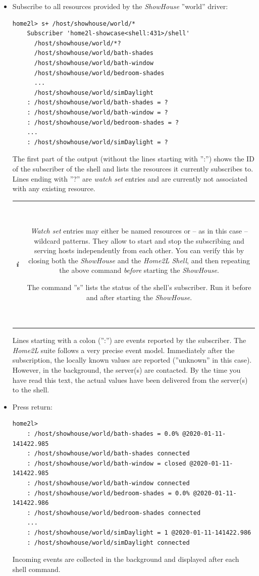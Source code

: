 \documentclass[12pt,english,parskip=half,headheight=19pt]{scrreprt}
\newcommand{\infobox}[1]{
  \par
  \medskip
  \hfill
  \setlength\arrayrulewidth{1pt}
  \begin{tabular}[t]{c|c|}
    \parbox{1.8em}{\hfill\textit{\Huge\textbf{i}\,}}
    &
    \,\parbox{0.89\linewidth}{\setlength{\parskip}{0.5em} \small #1}\,
  \end{tabular}
  \medskip
  \par
}
\begin{document}
\begin{itemize}[$\blacktriangleright$]
\item
  Subscribe to all resources provided by the \textit{ShowHouse} ''world'' driver:
  \begin{lstlisting}[language=home2l]
    home2l> s+ /host/showhouse/world/*
    Subscriber 'home2l-showcase<shell:431>/shell'
      /host/showhouse/world/*?
      /host/showhouse/world/bath-shades
      /host/showhouse/world/bath-window
      /host/showhouse/world/bedroom-shades
      ...
      /host/showhouse/world/simDaylight
    : /host/showhouse/world/bath-shades = ?
    : /host/showhouse/world/bath-window = ?
    : /host/showhouse/world/bedroom-shades = ?
    ...
    : /host/showhouse/world/simDaylight = ?
  \end{lstlisting}
  The first part of the output (without the lines starting with '':'')
  shows the ID of the subscriber of the shell and lists the resources it
  currently subscribes to. Lines ending with ''?'' are \textit{watch set}
  entries and are currently not associated with any existing resource.

  \infobox{
    \textit{Watch set} entries may either be named resources or -- as in this case -- wildcard
    patterns. They allow to start and stop the subscribing and serving hosts independently
    from each other. You can verify this by closing both the \textit{ShowHouse} and the \textit{Home2L Shell},
    and then repeating the above command \textit{before} starting the \textit{ShowHouse}.

    The command ''s'' lists the status of the shell's subscriber. Run it before and after starting
    the \textit{ShowHouse}.
  }

  Lines starting with a colon ('':'') are events reported by the
  subscriber. The \textit{Home2L} suite follows a very precise event model.
  Immediately after the subscription, the locally known values are
  reported (''unknown'' in this case). However, in the background,
  the server(s) are contacted. By the time you have read this text,
  the actual values have been delivered from the server(s) to the shell.

\item
  Press return:
  \begin{lstlisting}[language=home2l]
    home2l>
    : /host/showhouse/world/bath-shades = 0.0% @2020-01-11-141422.985
    : /host/showhouse/world/bath-shades connected
    : /host/showhouse/world/bath-window = closed @2020-01-11-141422.985
    : /host/showhouse/world/bath-window connected
    : /host/showhouse/world/bedroom-shades = 0.0% @2020-01-11-141422.986
    : /host/showhouse/world/bedroom-shades connected
    ...
    : /host/showhouse/world/simDaylight = 1 @2020-01-11-141422.986
    : /host/showhouse/world/simDaylight connected
  \end{lstlisting}
  Incoming events are collected in the background and displayed after each shell command.


\end{itemize}
\end{document}
